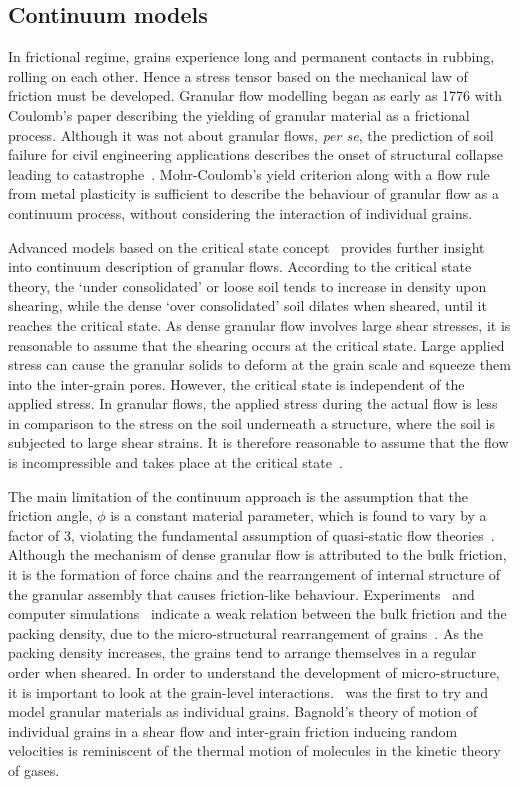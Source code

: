 \subsection{Continuum models}

In frictional regime, grains experience long and permanent contacts in rubbing, 
rolling on each other. Hence a stress tensor based on the mechanical law of 
friction must be developed. Granular flow modelling began as early as 1776 with 
Coulomb's paper describing the yielding of granular material as a frictional 
process. Although it was not about granular flows, \textit{per se}, the 
prediction of 
soil failure for civil engineering applications describes the onset of 
structural collapse leading to catastrophe~\citep{Campbell2006}. Mohr-Coulomb's 
yield criterion along with a flow rule from metal plasticity is sufficient to 
describe the behaviour of granular flow as a continuum process, without 
considering the interaction of individual grains.

Advanced models based on the critical state concept~\citep{Schofield1968} 
provides further insight into 
continuum description of granular flows. According to the critical state 
theory, the `under consolidated' or loose soil tends to increase in density 
upon shearing, while the dense `over consolidated' soil dilates when sheared, 
until it reaches the critical state. As dense granular flow involves large 
shear stresses, it is reasonable to assume that the shearing occurs at the 
critical state. Large applied stress can cause the granular solids to deform 
at the grain scale and squeeze them into the inter-grain pores. However, the 
critical state is independent of the applied stress. In granular flows, the 
applied stress during the actual flow is less in comparison to the stress on 
the soil underneath a structure, where the soil is subjected to large shear 
strains. It is therefore reasonable to assume that the flow is incompressible 
and takes place at the critical state~\citep{Campbell2006}. 

The main limitation 
of the continuum approach is the assumption that the friction angle, $\phi$ is 
a constant material parameter, which is found to vary by a factor of 3, 
violating the fundamental assumption of quasi-static flow 
theories~\citep{Potapov1996}. Although the mechanism of dense granular flow is 
attributed to the bulk friction, it is the formation of force chains and the 
rearrangement of internal structure of the granular assembly that causes 
friction-like behaviour. Experiments~\citep{Savage1984,Savage1984a} and 
computer simulations~\citep{Campbell1985} indicate a weak relation between the 
bulk friction and the packing density, due to the micro-structural 
rearrangement of grains~\citep{Campbell1986}. As the packing density 
increases, the grains tend to arrange themselves in a regular order when 
sheared. In order to understand the development of micro-structure, it is 
important to look at the grain-level interactions.~\citet{Bagnold1954} was 
the first to try and model granular materials as individual grains. 
Bagnold's theory of motion of individual grains in a shear flow and 
inter-grain friction inducing random velocities is reminiscent of the 
thermal motion of molecules in the kinetic theory of gases. 

